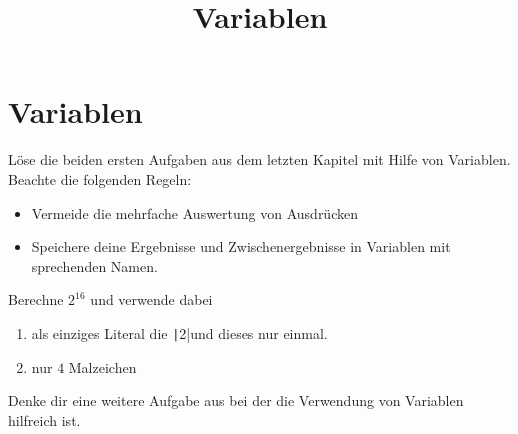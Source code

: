 \documentclass[class=scrartcl, crop=false]{standalone}
\title{Variablen}
\begin{document}
\section{Variablen}

\begin{aufgabe}
\noindent
Löse die beiden ersten Aufgaben aus dem letzten Kapitel mit Hilfe von Variablen. Beachte die folgenden Regeln:
\begin{itemize}
\item Vermeide die mehrfache Auswertung von Ausdrücken
\item Speichere deine Ergebnisse und Zwischenergebnisse in Variablen mit sprechenden Namen.
\end{itemize}
\end{aufgabe}

\begin{aufgabe}
\noindent
Berechne $2^{16}$ und verwende dabei 
\begin{enumerate}
\item als einziges Literal die \texttt|2|und dieses nur einmal.
\item nur $4$ Malzeichen
\end{enumerate}
\end{aufgabe}


\begin{aufgabe}
\noindent
Denke dir eine weitere Aufgabe aus bei der die Verwendung von Variablen hilfreich ist.
\end{aufgabe}
\end{document}
